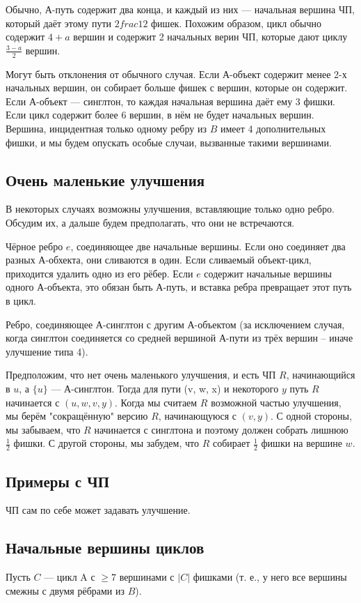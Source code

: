\begin{proofstar}
Обычно, А-путь содержит два конца, и каждый из них --- начальная вершина ЧП, который даёт этому пути $2
frac{1}{2}$ фишек. Похожим образом, цикл обычно содержит $4+a$ вершин и содержит 2 начальных верин ЧП, которые дают циклу $\frac{3-a}{2}$ вершин. 

Могут быть отклонения от обычного случая. Если А-объект содержит менее 2-х начальных вершин, он собирает больше фишек с вершин, которые он содержит. Если А-объект --- синглтон, то каждая начальная вершина даёт ему 3 фишки. Если цикл содержит более 6 вершин, в нём не будет начальных вершин. Вершина, инцидентная только одному ребру из $B$ имеет 4 дополнительных фишки, и мы будем опускать особые случаи, вызванные такими вершинами.

\subsection{Очень маленькие улучшения}
В некоторых случаях возможны улучшения, вставляющие только одно ребро. Обсудим их, а дальше будем предполагать, что они не встречаются.

Чёрное ребро $e$, соединяющее две начальные вершины. Если оно соединяет два разных А-обхекта, они сливаются в один. Если сливаемый объект-цикл, приходится удалить одно из его рёбер. Если $e$ содержит начальные вершины одного А-объекта, это обязан быть А-путь, и вставка ребра превращает этот путь в цикл.

Ребро, соединяющее А-синглтон с другим А-объектом (за исключением случая, когда синглтон соединяется со средней вершиной А-пути из трёх вершин -- иначе улучшение типа 4).

Предположим, что нет очень маленького улучшения, и есть ЧП $R$, начинающийся в $u$, а $\{u\}$ --- А-синглтон. Тогда для пути (v, w, x) и некоторого $y$ путь $R$ начинается с $(u, w, v, y)$. Когда мы считаем $R$ возможной частью улучшения, мы берём "сокращённую" версию $R$, начинающуюся с $(v, y)$. С одной стороны, мы забываем, что $R$ начинается с синглтона и поэтому должен собрать лишнюю $\frac{1}{2}$ фишки. С другой стороны, мы забудем, что $R$ собирает $\frac{1}{2}$ фишки на вершине $w$.

\subsection{Примеры с ЧП}
ЧП сам по себе может задавать улучшение. 

\subsection{Начальные вершины циклов}
Пусть $C$ --- цикл A с $\ge 7$ вершинами с $|C|$ фишками (т. е., у него все вершины смежны с двумя рёбрами из $B$).


\end{proofstar}
